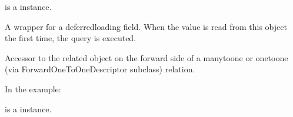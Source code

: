 \documentclass[letterpaper,10pt,english]{sphinxmanual}
\begin{document}
\begin{fulllineitems}
\begin{fulllineitems}
 is a  instance.

\end{fulllineitems}


\begin{fulllineitems}
\label{\detokenize{forums:forums.models.LikeComment1.comment1_id}}
\end{fulllineitems}


\begin{fulllineitems}
\label{\detokenize{forums:forums.models.LikeComment1.id}}
A wrapper for a deferred\sphinxhyphen{}loading field. When the value is read from this
object the first time, the query is executed.

\end{fulllineitems}


\begin{fulllineitems}
\label{\detokenize{forums:forums.models.LikeComment1.liker}}
Accessor to the related object on the forward side of a many\sphinxhyphen{}to\sphinxhyphen{}one or
one\sphinxhyphen{}to\sphinxhyphen{}one (via ForwardOneToOneDescriptor subclass) relation.

In the example:

\begin{sphinxVerbatim}[commandchars=\\\{\}]
 
       
\end{sphinxVerbatim}

 is a  instance.


\end{fulllineitems}
\end{fulllineitems}
\end{document}
